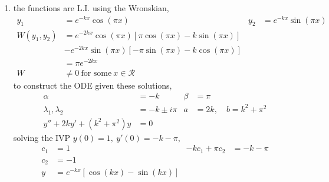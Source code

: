 \begin{enumerate}
    \item the functions are L.I. using the Wronskian,
          \begin{align}
              y_{1}           & = e^{-kx}\cos(\pi x)                                    & y_{2} & = e^{-kx}\sin(\pi x) \\
              W(y_{1}, y_{2}) & = e^{-2kx}\cos(\pi x)[\pi \cos(\pi x) - k\sin(\pi x)]                                  \\
                              & - e^{-2kx}\sin(\pi x) [-\pi \sin(\pi x) - k\cos(\pi x)]                                \\
                              & = \pi e^{-2kx}                                                                         \\
              W               & \neq 0\ \text{for some}\ x \in \mathcal{R}
          \end{align}
          to construct the ODE given these solutions,
          \begin{align}
              \alpha                          & = -k          & \beta & = \pi                           \\
              \lambda_{1}, \lambda_{2}        & = -k \pm i\pi & a     & = 2k, \quad b = k^{2} + \pi^{2} \\
              y'' + 2ky' + (k^{2} + \pi^{2})y & = 0
          \end{align}
          solving the IVP $ y(0) = 1,\ y'(0) = -k - \pi $,
          \begin{align}
              c_{1} & = 1                                        & -kc_{1} + \pi c_{2} & = -k-\pi \\
              c_{2} & = -1                                                                        \\
              y     & =e^{-kx}\left[ \cos(kx) - \sin(kx) \right]
          \end{align}


\end{enumerate}
